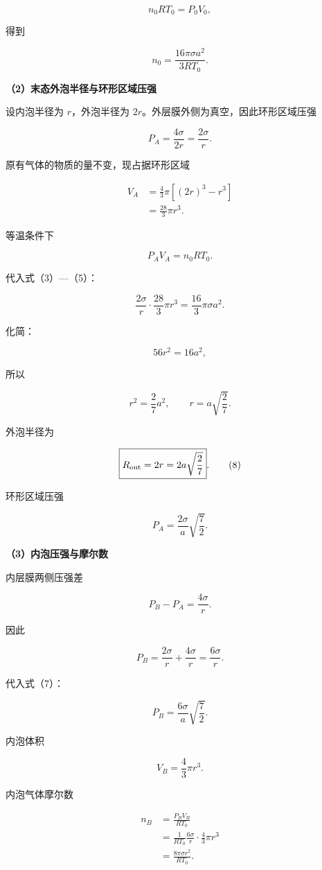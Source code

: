 \documentclass[12pt,a4paper,UTF8]{ctexart}
\begin{document}
\[
n_0RT_0=P_0V_0,
\]

得到

\[
\boxed{
n_0
=\frac{16\pi\sigma a^2}{3RT_0}
}.
\tag{3}
\]

\textbf{（2）末态外泡半径与环形区域压强}

设内泡半径为 \(r\)，外泡半径为
\(2r\)。外层膜外侧为真空，因此环形区域压强

\[
\boxed{
P_A=\frac{4\sigma}{2r}=\frac{2\sigma}{r}
}.
\tag{4}
\]

原有气体的物质的量不变，现占据环形区域

\[
\begin{aligned}
V_A
&=\frac43\pi[(2r)^3-r^3]\\
&=\frac{28}{3}\pi r^3.
\end{aligned}
\tag{5}
\]

等温条件下

\[
P_AV_A=n_0RT_0.
\tag{6}
\]

代入式（3）---（5）：

\[
\frac{2\sigma}{r}
\cdot\frac{28}{3}\pi r^3
=\frac{16}{3}\pi\sigma a^2.
\]

化简：

\[
56r^2=16a^2,
\]

所以

\[
r^2=\frac27a^2,
\qquad
r=a\sqrt{\frac27}.
\tag{7}
\]

外泡半径为

\[
\boxed{
R_{\rm out}=2r
=2a\sqrt{\frac27}
}.
\tag{8}
\]

环形区域压强

\[
\boxed{
P_A
=\frac{2\sigma}{a}\sqrt{\frac72}
}.
\tag{9}
\]

\textbf{（3）内泡压强与摩尔数}

内层膜两侧压强差

\[
P_B-P_A=\frac{4\sigma}{r}.
\tag{10}
\]

因此

\[
P_B
=\frac{2\sigma}{r}+\frac{4\sigma}{r}
=\frac{6\sigma}{r}.
\]

代入式（7）：

\[
\boxed{
P_B
=\frac{6\sigma}{a}\sqrt{\frac72}
}.
\tag{11}
\]

内泡体积

\[
V_B=\frac43\pi r^3.
\]

内泡气体摩尔数

\[
\begin{aligned}
n_B
&=\frac{P_BV_B}{RT_0}\\
&=\frac1{RT_0}
\frac{6\sigma}{r}\cdot\frac43\pi r^3\\
&=\frac{8\pi\sigma r^2}{RT_0}.
\end{aligned}
\]
\end{document}
